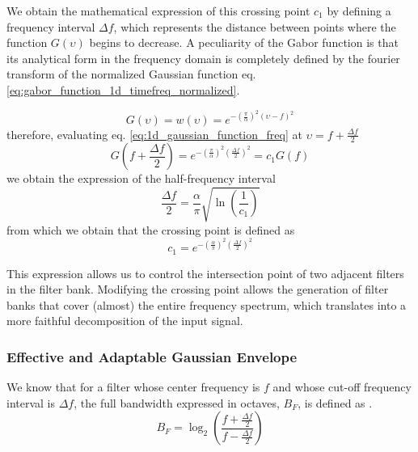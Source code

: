 We obtain the mathematical expression of this crossing point $c_1$ by defining a frequency interval $\Delta f$, which represents the distance between points where the function $G(\upsilon)$ begins to decrease. A peculiarity of the Gabor function is that its analytical form in the frequency domain is completely defined by the fourier transform of the normalized Gaussian function eq. \eqref{eq:gabor_function_1d_timefreq_normalized}.

\begin{equation}\label{eq:1d_gaussian_function_freq}
    G(\upsilon) = w(\upsilon) = e ^{-\left(\frac{\pi}{\alpha}\right) ^{2} (\upsilon-f)^2}
\end{equation}
therefore, evaluating eq. \eqref{eq:1d_gaussian_function_freq} at $\upsilon = f + \frac{\Delta f}{2}$
\begin{equation}\label{eq:constant_crossing_point}
    G\left(f + \frac{\Delta f}{2}\right) = e^{-\left(\frac{\pi}{\alpha}\right)^2 \left(\frac{\Delta f}{2}\right)^2} = c_1 G(f) 
\end{equation}
we obtain the expression of the half-frequency interval 
\begin{equation}\label{eq:frequency_interval_crossing_point}
    \frac{\Delta f}{2} = \frac{\alpha}{\pi}\sqrt{\ln \left(\frac{1}{c_1}\right)}
\end{equation}
from which we obtain that the crossing point is defined as
\begin{equation}\label{eq:crossing_point}
    c_1 = e^{-\left(\frac{\alpha}{\pi} \right)^2 \left(\frac{\Delta f}{2}\right)^2 }
\end{equation}

This expression allows us to control the intersection point of two adjacent filters in the filter bank. Modifying the crossing point allows the generation of filter banks that cover (almost) the entire frequency spectrum, which translates into a more faithful decomposition of the input signal.

\subsubsection{Effective and Adaptable Gaussian Envelope}
We know that for a filter whose center frequency is $f$ and whose cut-off frequency interval is $\Delta f$, the full bandwidth expressed in octaves, $B_F$, is defined as \citep{Daugman:JOSA:1985a}.
\begin{equation}\label{eq:frequency_bandwidth_interval}
    B_F = \log_2 \left( \frac{f + \frac{\Delta f}{2} }{f - \frac{\Delta f}{2}} \right)
\end{equation}


